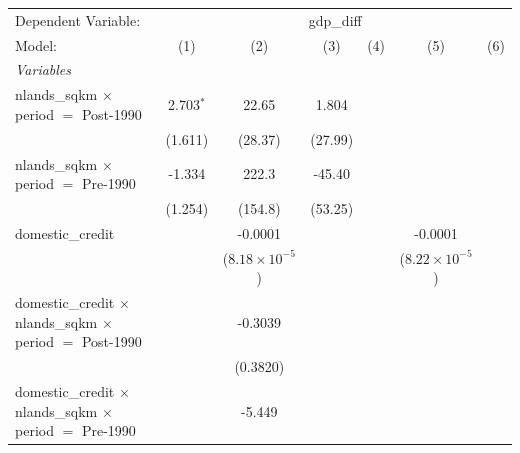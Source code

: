 
\begingroup
\centering
\begin{tabular}{lcccccc}
   \tabularnewline \midrule \midrule
   Dependent Variable: & \multicolumn{6}{c}{gdp\_diff}\\
   Model:                                                                                 & (1)         & (2)                     & (3)             & (4)      & (5)                     & (6)\\  
   \midrule
   \emph{Variables}\\
   nlands\_sqkm $\times$ period $=$ Post-1990                                             & 2.703$^{*}$ & 22.65                   & 1.804           &          &                         &   \\   
                                                                                          & (1.611)     & (28.37)                 & (27.99)         &          &                         &   \\   
   nlands\_sqkm $\times$ period $=$ Pre-1990                                              & -1.334      & 222.3                   & -45.40          &          &                         &   \\   
                                                                                          & (1.254)     & (154.8)                 & (53.25)         &          &                         &   \\   
   domestic\_credit                                                                       &             & -0.0001                 &                 &          & -0.0001                 &   \\   
                                                                                          &             & ($8.18\times 10^{-5}$)  &                 &          & ($8.22\times 10^{-5}$)  &   \\   
   domestic\_credit $\times$ nlands\_sqkm $\times$ period $=$ Post-1990                   &             & -0.3039                 &                 &          &                         &   \\   
                                                                                          &             & (0.3820)                &                 &          &                         &   \\   
   domestic\_credit $\times$ nlands\_sqkm $\times$ period $=$ Pre-1990                    &             & -5.449                  &                 &          &                         &   \\   

\end{tabular}
